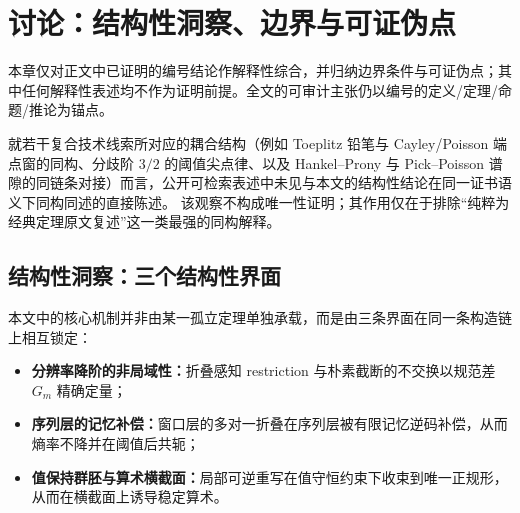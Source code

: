\section{讨论：结构性洞察、边界与可证伪点}\label{sec:discussion}

本章仅对正文中已证明的编号结论作解释性综合，并归纳边界条件与可证伪点；其中任何解释性表述均不作为证明前提。全文的可审计主张仍以编号的定义/定理/命题/推论为锚点。

\begin{remark}\label{rem:discussion-nonduplicate-structural-phrases}
就若干复合技术线索所对应的耦合结构（例如 Toeplitz 铅笔与 Cayley/Poisson 端点窗的同构、分歧阶 \(3/2\) 的阈值尖点律、以及 Hankel--Prony 与 Pick--Poisson 谱隙的同链条对接）而言，公开可检索表述中未见与本文的结构性结论在同一证书语义下同构同述的直接陈述。
该观察不构成唯一性证明；其作用仅在于排除“纯粹为经典定理原文复述”这一类最强的同构解释。
\end{remark}

\subsection{结构性洞察：三个结构性界面}\label{subsec:structural-insights}
本文中的核心机制并非由某一孤立定理单独承载，而是由三条界面在同一条构造链上相互锁定：
\begin{itemize}
  \item \textbf{分辨率降阶的非局域性：}折叠感知 restriction 与朴素截断的不交换以规范差 \(G_m\) 精确定量；
  \item \textbf{序列层的记忆补偿：}窗口层的多对一折叠在序列层被有限记忆逆码补偿，从而熵率不降并在阈值后共轭；
  \item \textbf{值保持群胚与算术横截面：}局部可逆重写在值守恒约束下收束到唯一正规形，从而在横截面上诱导稳定算术。
\end{itemize}
